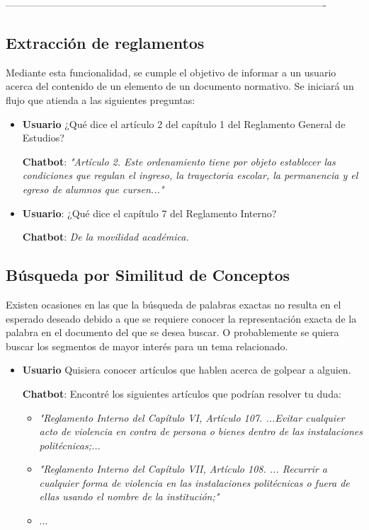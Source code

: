 -------------------------------------------------------------------------------------------------

%
%

\subsection{Extracción de reglamentos}

Mediante esta funcionalidad, se cumple el objetivo de informar a un usuario acerca del contenido de un elemento de un documento normativo. Se iniciará un flujo que atienda a las siguientes preguntas:

\begin{itemize}
    \item
    \textbf{Usuario} ¿Qué dice el artículo 2 del capítulo 1 del Reglamento General de Estudios?
    
    \textbf{Chatbot}: \textit{"Artículo 2. Este ordenamiento tiene por objeto establecer las condiciones que regulan el ingreso, la trayectoria escolar, la permanencia y el egreso de alumnos que cursen..."}

    \item
    \textbf{Usuario}: ¿Qué dice el capítulo 7 del Reglamento Interno?
    
    \textbf{Chatbot}: \textit{De la movilidad académica.}
\end{itemize}



\subsection{Búsqueda por Similitud de Conceptos}

Existen ocasiones en las que la búsqueda de palabras exactas no resulta en el esperado deseado debido a que se requiere conocer la representación exacta de la palabra en el documento del que se desea buscar. O probablemente se quiera buscar los segmentos de mayor interés para un tema relacionado.

\begin{itemize}
    \item
    \textbf{Usuario} Quisiera conocer artículos que hablen acerca de golpear a alguien.
    
    \textbf{Chatbot}: Encontré los siguientes artículos que podrían resolver tu duda:
    
    \begin{itemize}
        \item \textit{"Reglamento Interno del Capítulo VI, Artículo 107. ...Evitar cualquier acto de violencia en contra de persona o bienes dentro de las instalaciones politécnicas;...}
        \item \textit{"Reglamento Interno del Capítulo VII, Artículo 108. ... Recurrir a cualquier forma de violencia en las instalaciones politécnicas o fuera de ellas usando el nombre de la institución;"}
        \item ...
    \end{itemize}
\end{itemize}
